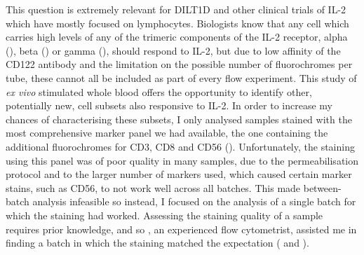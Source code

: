 This question is extremely relevant for DILT1D and other clinical trials of IL-2 which have mostly focused on lymphocytes.  %
Biologists know that any cell which carries high levels of any of the trimeric components of the IL-2 receptor,
alpha (), beta () or gamma (), should respond to IL-2,
but due to low affinity of the CD122 antibody and the limitation on the possible number of fluorochromes per tube, these cannot all be included as part of every flow experiment.  
This study of \emph{ex vivo} stimulated whole blood offers the opportunity to identify other, potentially new, cell subsets also responsive to IL-2.
In order to increase my chances of characterising these subsets, I only analysed samples stained with the most comprehensive marker panel we had available, the one containing the additional fluorochromes for CD3, CD8 and CD56 ().
Unfortunately, the staining using this panel was of poor quality in many samples, due to the permeabilisation protocol and to the larger number of markers used, which caused certain marker stains, such as CD56, to not work well across all batches.
This made between-batch analysis infeasible so instead, I focused on the analysis of a single batch for which the staining had worked. %
Assessing the staining quality of a sample requires prior knowledge, and so , an experienced
flow cytometrist, assisted me in finding a batch in which the staining matched the expectation ( and ).

